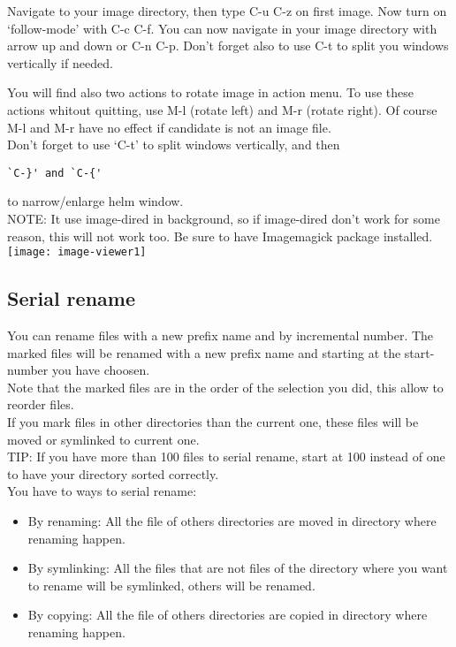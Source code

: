 \documentclass[a4paper,11pt]{article}
\begin{document}
Navigate to your image directory, then type C-u C-z on first image.
Now turn on `follow-mode' with C-c C-f.
You can now navigate in your image directory with arrow up and down or C-n C-p.
Don't forget also to use C-t to split you windows vertically if needed.

You will find also two actions to rotate image in action menu. 
To use these actions whitout quitting, use M-l (rotate left) and M-r (rotate right).
Of course M-l and M-r have no effect if candidate is not an image file.\\

Don't forget to use `C-t' to split windows vertically, and then
\begin{verbatim}
`C-}' and `C-{'
\end{verbatim}
to narrow/enlarge helm window.\\

NOTE:
It use image-dired in background, so if image-dired don't work for some reason, this will
not work too.
Be sure to have Imagemagick package installed.\\

\texttt{[image: image-viewer1]}
\newpage

\subsection{Serial rename}
\label{sec:serial-rename}
You can rename files with a new prefix name and by incremental number.
The marked files will be renamed with a new prefix name and starting
at the start-number you have choosen.\\
Note that the marked files are in the order of the selection you did, this allow to reorder
files.\\
If you mark files in other directories than the current one, these files will be moved or symlinked to current one.\\

TIP: If you have more than 100 files to serial rename, start at 100 instead of one to have your directory
sorted correctly.\\

You have to ways to serial rename:\\
\begin{itemize}
\item By renaming: All the file of others directories are moved in directory where renaming happen.\\ 
\end{itemize}
\begin{itemize}
\item By symlinking: All the files that are not files of the directory where you want to rename will be symlinked,
others will be renamed.\\
\end{itemize}
\begin{itemize}
\item By copying: All the file of others directories are copied in directory where renaming happen.\\ 
\end{itemize}
\end{document}
